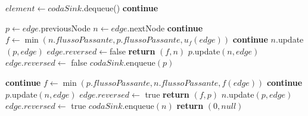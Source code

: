 \documentclass{article}
\begin{document}
\begin{algorithm}
    \begin{algorithmic}
        \STATE $element \leftarrow codaSink.$dequeue()
        \STATE \textbf{continue}
        \ENDIF

        \STATE $p \leftarrow edge.$previousNode
        \STATE $n \leftarrow edge$.nextNode
        \STATE \textbf{continue}
        \ELSE
        \STATE $f \leftarrow \min (n.flussoPassante,p.flussoPassante,u_f(edge))$
        \STATE \textbf{continue}
        \ENDIF
        \STATE $n$.update$(p,edge)$
        \STATE $edge.reversed \leftarrow $false
        \STATE \textbf{return} $(f,n)$
        \ENDIF
        \ENDIF
        \STATE $p.$update$(n,edge)$
        \STATE $edge.reversed \leftarrow$ false
        \STATE $codaSink.$enqueue$(p)$
    \end{algorithmic}
\end{algorithm}
\newpage
\begin{algorithm}
    \begin{algorithmic}
        \STATE \textbf{continue}
        \ELSE
        \STATE $f \leftarrow \min(p.flussoPassante,n.flussoPassante,f(edge))$
        \STATE \textbf{continue}
        \ENDIF
        \STATE $p.$update$(n,edge)$
        \STATE $edge.reversed \leftarrow$ true
        \STATE \textbf{return } $(f,p)$
        \ENDIF
        \ENDIF
        \STATE $n.$update$(p,edge)$
        \STATE $edge.reversed \leftarrow$ true
        \STATE $codaSink.$enqueue$(n)$
        \ENDIF
        \ENDFOR
        \ENDIF
        \ENDWHILE
        \STATE \textbf{return} $(0,null)$
    \end{algorithmic}
\end{algorithm}
\end{document}
